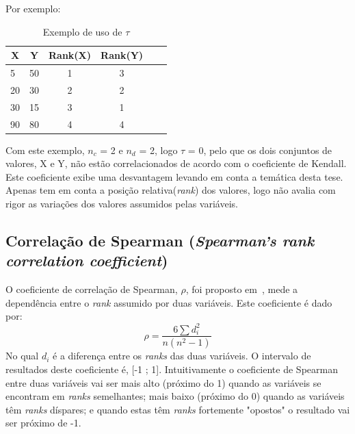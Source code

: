 Por exemplo:
\begin{table}[ht]
	\caption{Exemplo de uso de $\tau$}
	\label{tab:hla:results}
\centering
\begin{tabular}{lccccc}
	\toprule
	\multicolumn{1}{c}{\textbf{X}} 	& \textbf{Y}	& \textbf{Rank(X)}	& \textbf{Rank(Y)} \\
	\midrule
5 & 50 & 1 & 3 &  \\
20 & 30 & 2 & 2 &  \\
30 & 15 & 3 & 1 &  \\
90 & 80 & 4 & 4 &  \\
	\midrule
\end{tabular}
\end{table}

Com este exemplo, $n_{c}$ = 2 e $n_{d}$ = 2, logo $\tau$ = 0, pelo que os dois conjuntos de valores, X e Y, não estão correlacionados de acordo com o coeficiente de Kendall. Este coeficiente exibe uma desvantagem levando em conta a temática desta tese. Apenas tem em conta a posição relativa(\textit{rank}) dos valores, logo não avalia com rigor as variações dos valores assumidos pelas variáveis. \\

\subsection{Correlação de Spearman (\textit{Spearman's rank correlation coefficient})}
O coeficiente de correlação de Spearman, $\rho$, foi proposto em~\cite{spearman1904proof}, mede a dependência entre o \textit{rank} assumido por duas variáveis.
Este coeficiente é dado por:
\begin{equation}
    \rho = \frac{6\sum d_{i}^{2}}{n(n^{2}-1)}
\end{equation}
No qual $d_{i}$ é a diferença entre os \textit{ranks} das duas variáveis. O intervalo de resultados deste coeficiente é, [-1 ; 1]. Intuitivamente o coeficiente de Spearman entre duas variáveis vai ser mais alto (próximo do 1) quando as variáveis se encontram em \textit{ranks} semelhantes; mais baixo (próximo do 0) quando as variáveis têm \textit{ranks} díspares; e quando estas têm \textit{ranks} fortemente "opostos" \thinspace o resultado vai ser próximo de -1.

